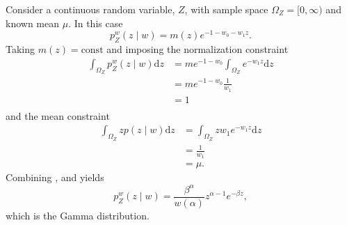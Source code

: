 \begin{example}
	Consider a continuous random variable, $Z$, with sample space $\Omega_Z = [0,\infty)$ and known mean $\mu$. In this case
	\begin{equation}
		p_{Z}^w(z \mid w) = m(z) e^{-1-w_0 - w_1 z}.
		\label{eq:n13}
	\end{equation}
	Taking $m(z) = \text{const}$ and imposing the normalization constraint
	\begin{equation}
		\begin{split}
			\int_{\Omega_Z} p_{Z}^w(z \mid w) \mathrm{d}z &= m e^{-1-w_0}\int_{\Omega_Z} e^{- w_1 z} \mathrm{d}z\\
			& = m e^{-1-w_0} \frac{1}{w_1}\\
			&= 1\\
		\end{split}
		\label{eq:na1}
	\end{equation}
	and the mean constraint
	\begin{equation}
		\begin{split}
			\int_{\Omega_Z} z p(z \mid w) \mathrm{d}z&= \int_{\Omega_Z} z w_1 e^{-w_1 z} \mathrm{d}z\\
			& = \frac{1}{w_1}\\
			&= \mu.
		\end{split}
		\label{eq:na2}
	\end{equation}
	Combining ,  and  yields
	\begin{equation}
		p_{Z}^w(z \mid w) = \frac{\beta^\alpha}{w(\alpha)} z^{\alpha-1} e^{-\beta z},
	\end{equation}
	which is the Gamma distribution.
\end{example}



